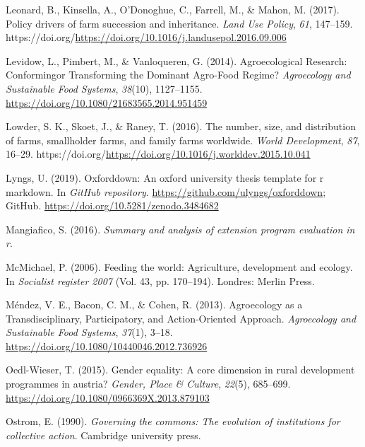 \documentclass[a4paper, nobind]{templates/ociamthesis}
\newlength{\cslhangindent}
\newenvironment{CSLReferences}[2] %
 {%
  \setlength{\parindent}{0pt}
  \ifodd #1
  \let\oldpar\par
  \def\par{\hangindent=\cslhangindent\oldpar}
  \fi
  \setlength{\parskip}{1mm}
  \setlength{\baselineskip}{6mm}
 }%
 {}
\begin{document}
\begin{CSLReferences}{1}{0}
\leavevmode{}%
Leonard, B., Kinsella, A., O'Donoghue, C., Farrell, M., \& Mahon, M. (2017). Policy drivers of farm succession and inheritance. \emph{Land Use Policy}, \emph{61}, 147--159. https://doi.org/\url{https://doi.org/10.1016/j.landusepol.2016.09.006}

\leavevmode{}%
Levidow, L., Pimbert, M., \& Vanloqueren, G. (2014). Agroecological Research: Conforming{\textemdash}or Transforming the Dominant Agro-Food Regime? \emph{Agroecology and Sustainable Food Systems}, \emph{38}(10), 1127--1155. \url{https://doi.org/10.1080/21683565.2014.951459}

\leavevmode{}%
Lowder, S. K., Skoet, J., \& Raney, T. (2016). The number, size, and distribution of farms, smallholder farms, and family farms worldwide. \emph{World Development}, \emph{87}, 16--29. https://doi.org/\url{https://doi.org/10.1016/j.worlddev.2015.10.041}

\leavevmode{}%
Lyngs, U. (2019). Oxforddown: An oxford university thesis template for r markdown. In \emph{GitHub repository}. \url{https://github.com/ulyngs/oxforddown}; GitHub. \url{https://doi.org/10.5281/zenodo.3484682}

\leavevmode{}%
Mangiafico, S. (2016). \emph{Summary and analysis of extension program evaluation in r}.

\leavevmode{}%
McMichael, P. (2006). Feeding the world: Agriculture, development and ecology. In \emph{Socialist register 2007} (Vol. 43, pp. 170--194). Londres: Merlin Press.

\leavevmode{}%
Méndez, V. E., Bacon, C. M., \& Cohen, R. (2013). Agroecology as a Transdisciplinary, Participatory, and Action-Oriented Approach. \emph{Agroecology and Sustainable Food Systems}, \emph{37}(1), 3--18. \url{https://doi.org/10.1080/10440046.2012.736926}

\leavevmode{}%
Oedl-Wieser, T. (2015). Gender equality: A core dimension in rural development programmes in austria? \emph{Gender, Place \& Culture}, \emph{22}(5), 685--699. \url{https://doi.org/10.1080/0966369X.2013.879103}

\leavevmode{}%
Ostrom, E. (1990). \emph{Governing the commons: The evolution of institutions for collective action}. Cambridge university press.


\end{CSLReferences}
\end{document}
